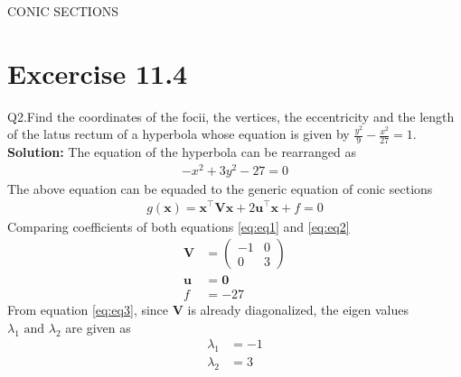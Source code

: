 \documentclass[12pt]{article}
\providecommand{\brak}[1]{\ensuremath{\left(#1\right)}}
\newcommand{\solution}{\noindent \textbf{Solution: }}
\newcommand{\myvec}[1]{\ensuremath{\begin{pmatrix}#1\end{pmatrix}}}
\let\vec\mathbf
\begin{document}
\begin{center}
\textbf\large{CONIC SECTIONS}

\end{center}
\section*{Excercise 11.4}
Q2.Find the coordinates of the focii, the vertices, the eccentricity and the length of the latus rectum of a hyperbola whose equation is given by $\frac{y^2}{9}-\frac{x^2}{27}=1$.
\solution
The equation of the hyperbola can be rearranged as
\begin{align}
	\label{eq:eq1}
	-x^2 + 3y^2 -27 = 0
\end{align}
The above equation can be equaded to the generic equation of conic sections
\begin{align}
	\label{eq:eq2}
	g\brak{\vec{x}}=\vec{x}^\top \vec{V} \vec{x} + 2\vec{u}^\top \vec{x} + f = 0
\end{align}
Comparing coefficients of both equations \eqref{eq:eq1} and \eqref{eq:eq2}
\begin{align}
	\label{eq:eq3}
	\vec{V} &= \myvec{-1&0\\0&3}\\
	\vec{u} &= \vec{0}\\
	f &= -27
\end{align}
From equation \eqref{eq:eq3}, since $\vec{V}$ is already diagonalized, the eigen values $\lambda_1 \text{ and } \lambda_2$ are given as
\begin{align}
	\lambda_1 &= -1\\
	\lambda_2 &= 3
\end{align}
\end{document}
